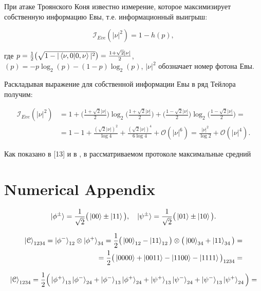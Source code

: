 \documentclass[a4paper,11pt]{article}
\begin{document}
При атаке Троянского Коня известно измерение, которое максимизирует собственную информацию Евы, т.е. информационный выигрыш:

\begin{equation*}
\mathcal{I}_{Eve}(|\nu|^2) = 1 - h(p),
\end{equation*}

где $p = \frac{1}{2} \big(\sqrt{1 - |\braket{\nu, 0 | 0, \nu}|^2 } \big) = \frac{1 + \sqrt2 |\nu|}{2}$, $(p) = -p\log_2(p) - (1-p)\log_2(p)$, $|\nu|^2$ обозначает номер фотона Евы.

Раскладывая выражение для собственной информации Евы в ряд Тейлора получим:

\begin{align*}
\mathcal{I}_{Eve}(|\nu|^2) &= 1 + 
\Big( \frac{1 + \sqrt2 |\nu|}{2} \Big) \log_2 \Big(\frac{1 + \sqrt2 |\nu|}{2}\Big) + \Big( \frac{1 - \sqrt2 |\nu|}{2} \Big) \log_2 \Big(\frac{1 - \sqrt2 |\nu|}{2}\Big) = \nonumber \\
&= 1 - 1 + \frac{(\sqrt2 |\nu|)^2}{\log4} + \frac{(\sqrt2 |\nu|)^4}{6\log4} + \mathcal{O}(|\nu|^6) = \frac{|\nu|^2}{\log2} + \mathcal{O}(|\nu|^4).
\end{align*}


Как показано в [13] и в , в рассматриваемом протоколе максимальные средний  


\section{Numerical Appendix}

\begin{equation*}
\ket{\phi^{\pm}} = \dfrac{1}{\sqrt2}\big(\ket{00} \pm \ket{11} \big), \quad
\ket{\psi^{\pm}} = \dfrac{1}{\sqrt2}\big(\ket{01} \pm \ket{10} \big).
\end{equation*}



\begin{align*}
\ket{\mathcal{C}}_{1234} = \ket{\phi^-}_{12} \otimes \ket{\phi^+}_{34}
= \dfrac{1}{2} \big(\ket{00}_{12} - \ket{11}_{12} \big) \otimes \big( \ket{00}_{34} + \ket{11}_{34} \big) = \nonumber \\
= \dfrac{1}{2} \big(\ket{0000} + \ket{0011} - \ket{1100} - \ket{1111}\big)_{1234} =
\end{align*}

\begin{align*}
\ket{\mathcal{C}}_{1234} = \dfrac{1}{2} \Big(\ket{\phi^+}_{13} \ket{\phi^-}_{24} + 
\ket{\phi^-}_{13} \ket{\phi^+}_{24} +
\ket{\psi^+}_{13} \ket{\psi^-}_{24} +
\ket{\psi^-}_{13} \ket{\psi^+}_{24} \Big) = \nonumber \\
\end{align*}
\end{document}
